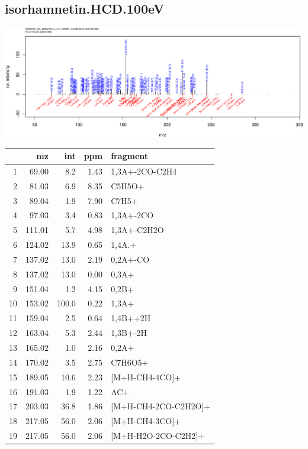 \documentclass[]{article}
\begin{document}
\clearpage\subsection{isorhamnetin.HCD.100eV}
\includegraphics[width=\textwidth]{WEB350_files/figure-latex/unnamed-chunk-3-42}

\begin{table}[ht]
\centering
\begin{tabular}{rrrrl}
  \toprule
 & mz & int & ppm & fragment \\ 
  \midrule
1 & 69.00 & 8.2 & 1.43 & 1,3A+-2CO-C2H4 \\ 
  2 & 81.03 & 6.9 & 8.35 & C5H5O+ \\ 
  3 & 89.04 & 1.9 & 7.90 & C7H5+ \\ 
  4 & 97.03 & 3.4 & 0.83 & 1,3A+-2CO \\ 
  5 & 111.01 & 5.7 & 4.98 & 1,3A+-C2H2O \\ 
  6 & 124.02 & 13.9 & 0.65 & 1,4A.+ \\ 
  7 & 137.02 & 13.0 & 2.19 & 0,2A+-CO \\ 
  8 & 137.02 & 13.0 & 0.00 & 0,3A+ \\ 
  9 & 151.04 & 1.2 & 4.15 & 0,2B+ \\ 
  10 & 153.02 & 100.0 & 0.22 & 1,3A+ \\ 
  11 & 159.04 & 2.5 & 0.64 & 1,4B++2H \\ 
  12 & 163.04 & 5.3 & 2.44 & 1,3B+-2H \\ 
  13 & 165.02 & 1.0 & 2.16 & 0,2A+ \\ 
  14 & 170.02 & 3.5 & 2.75 & C7H6O5+ \\ 
  15 & 189.05 & 10.6 & 2.23 & [M+H-CH4-4CO]+ \\ 
  16 & 191.03 & 1.9 & 1.22 & AC+ \\ 
  17 & 203.03 & 36.8 & 1.86 & [M+H-CH4-2CO-C2H2O]+ \\ 
  18 & 217.05 & 56.0 & 2.06 & [M+H-CH4-3CO]+ \\ 
  19 & 217.05 & 56.0 & 2.06 & [M+H-H2O-2CO-C2H2]+ \\ 

\end{tabular}
\end{table}
\end{document}
